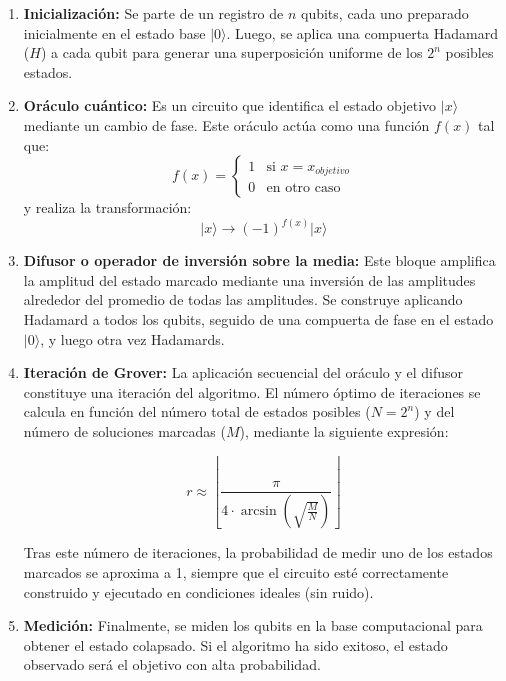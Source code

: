 \documentclass{article}
\begin{document}
\begin{enumerate}
    \item \textbf{Inicialización:} Se parte de un registro de $n$ qubits, cada uno preparado inicialmente en el estado base $\vert 0 \rangle$. Luego, se aplica una compuerta Hadamard ($H$) a cada qubit para generar una superposición uniforme de los $2^n$ posibles estados.

    \item \textbf{Oráculo cuántico:} Es un circuito que identifica el estado objetivo $\vert x \rangle$ mediante un cambio de fase. Este oráculo actúa como una función $f(x)$ tal que:
    \[
    f(x) = \begin{cases}
    1 & \text{si } x = x_{objetivo} \\
    0 & \text{en otro caso}
    \end{cases}
    \]
    y realiza la transformación:
    \[
    \vert x \rangle \rightarrow (-1)^{f(x)} \vert x \rangle
    \]

    \item \textbf{Difusor o operador de inversión sobre la media:} Este bloque amplifica la amplitud del estado marcado mediante una inversión de las amplitudes alrededor del promedio de todas las amplitudes. Se construye aplicando Hadamard a todos los qubits, seguido de una compuerta de fase en el estado $\vert 0 \rangle$, y luego otra vez Hadamards.

    \item \textbf{Iteración de Grover:} La aplicación secuencial del oráculo y el difusor constituye una iteración del algoritmo. 
    El número óptimo de iteraciones se calcula en función del número total de estados posibles ($N = 2^n$) y del número de soluciones marcadas ($M$), mediante la siguiente expresión:

    \[
    r \approx \left\lfloor \frac{\pi}{4 \cdot \arcsin\left( \sqrt{\frac{M}{N}} \right)} \right\rfloor
    \]

    Tras este número de iteraciones, la probabilidad de medir uno de los estados marcados se aproxima a 1, siempre que el circuito esté correctamente construido y ejecutado en condiciones ideales (sin ruido).


    \item \textbf{Medición:} Finalmente, se miden los qubits en la base computacional para obtener el estado colapsado. Si el algoritmo ha sido exitoso, el estado observado será el objetivo con alta probabilidad.
    
\end{enumerate}
\end{document}
